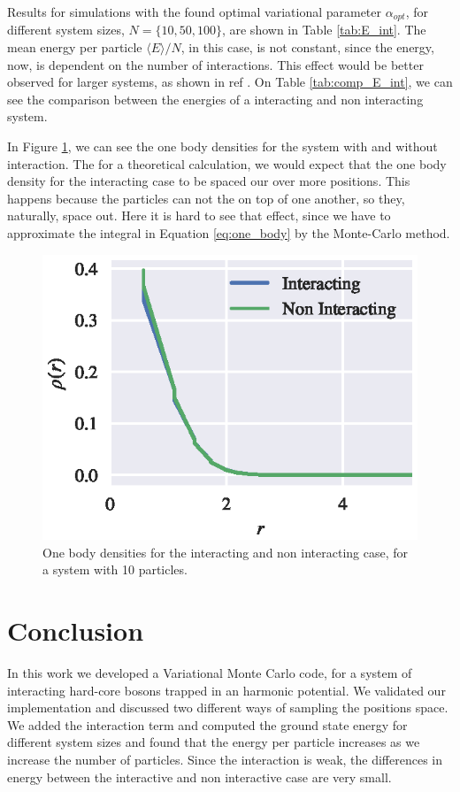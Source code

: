 \documentclass[aps,reprint,superscriptaddress,nofootinbib]{revtex4-2}
\begin{document}
    Results for simulations with the found optimal variational parameter \(\alpha_{opt}\), for different system sizes, \(N = \{10, 50, 100\}\), are shown in Table \ref{tab:E_int}. The mean energy per particle \(\langle E \rangle / N\), in this case, is not constant, since the energy, now, is dependent on the number of interactions. This effect would be better observed for larger systems, as shown in ref \cite{bec-trapped-bosons}. On Table \ref{tab:comp_E_int}, we can see the comparison between the energies of a interacting and non interacting system. 
    
    In Figure \ref{fig:one_body_densities}, we can see the one body densities for the system with and without interaction. The for a theoretical calculation, we would expect that the one body density for the interacting case to be spaced our over more positions. This happens because the particles can not the on top of one another, so they, naturally, space out. Here it is hard to see that effect, since we have to approximate the integral in Equation \eqref{eq:one_body} by the Monte-Carlo method.
    
    \begin{figure}
        \centering
        \includegraphics{figures/part_g/one_body_densities.eps}
        \caption{One body densities for the interacting and non interacting case, for a system with 10 particles.}
        \label{fig:one_body_densities}
    \end{figure}
    
    \section*{Conclusion}
    
    In this work we developed a Variational Monte Carlo code, for a system of interacting hard-core bosons trapped in an harmonic potential. We validated our implementation and discussed two different ways of sampling the positions space. We added the interaction term and computed the ground state energy for different system sizes and found that the energy per particle increases as we increase the number of particles. Since the interaction is weak, the differences in energy between the interactive and non interactive case are very small.

    
    
\end{document}
